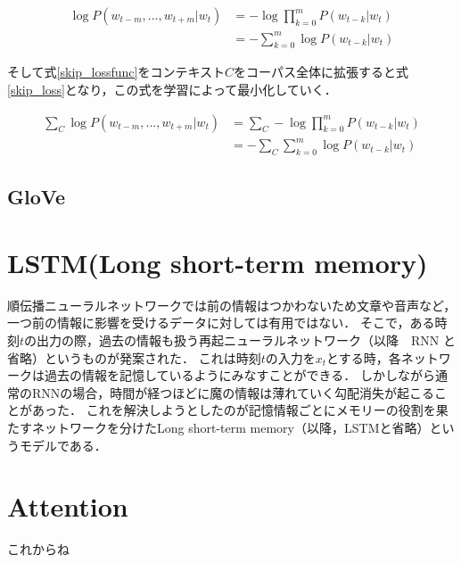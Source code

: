 \documentclass[a4j,11pt,report]{jsbook}
\begin{document}
\begin{equation}
  \label{skip_lossfunc}
  \begin{split}
    \log P(w_{t-m},...,w_{t+m}|w_{t} ) &= -\log \prod_{k = 0}^m P(w_{t-k}|w_{t})   \\
                                       &= - \sum_{k = 0}^m \log P(w_{t-k} | w_{t})
  \end{split}
\end{equation}

そして式\ref{skip_lossfunc}をコンテキスト$C$をコーパス全体に拡張すると式\ref{skip_loss}となり，この式を学習によって最小化していく．

\begin{equation}
  \label{skip_loss}
  \begin{split}
    \sum_{C} \log P(w_{t-m},...,w_{t+m}|w_{t} ) &= \sum_{C} -\log \prod_{k = 0}^m P(w_{t-k}|w_{t})   \\
                                       &= - \sum_{C} \sum_{k = 0}^m \log P(w_{t-k} | w_{t})
  \end{split}
\end{equation}




\section{GloVe \label{sec:GloVe}}
\fi


\chapter{LSTM(Long short-term memory)\label{ch:LSTM}}
順伝播ニューラルネットワークでは前の情報はつかわないため文章や音声など，一つ前の情報に影響を受けるデータに対しては有用ではない．
そこで，ある時刻$t$の出力の際，過去の情報も扱う再起ニューラルネットワーク（以降　RNN と省略）というものが発案された．
これは時刻$t$の入力を$x_{t}$とする時，各ネットワークは過去の情報を記憶しているようにみなすことができる．
しかしながら通常のRNNの場合，時間が経つほどに魔の情報は薄れていく勾配消失が起こることがあった．
これを解決しようとしたのが記憶情報ごとにメモリーの役割を果たすネットワークを分けたLong short-term memory（以降，LSTMと省略）というモデルである．






\chapter{Attention\label{ch:Attention}}
これからね
\fi
\end{document}
